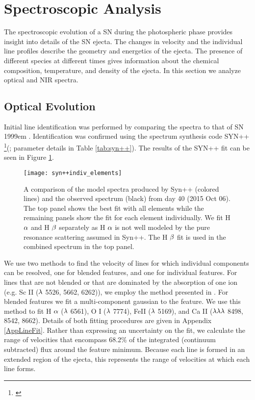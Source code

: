 \documentclass[a4paper,fleqn,usenatbib]{mnras}
\begin{document}
\section{Spectroscopic Analysis} \label{sec:SpecEvolve}
The spectroscopic evolution of a SN during the photospheric phase provides insight into details of the SN ejecta.
The changes in velocity and the individual line profiles describe the geometry and energetics of the ejecta. 
The presence of different species at different times gives information about the chemical composition, temperature, and density of the ejecta.
In this section we analyze optical and NIR spectra.
\subsection{Optical Evolution} \label{OpticalEvolve}
Initial line identification was performed by comparing the spectra to that of SN 1999em \citep{2001leonard}. 
Identification was confirmed using the spectrum synthesis code SYN++ \footnote{\citet{2013thomas}}(\citealt{2011thomas}; parameter details in Table \ref{tab:syn++}). 
The results of the SYN++ fit can be seen in Figure \ref{fig:syn++}.
\begin{figure*}
\begin{center}
\texttt{[image: syn++indiv\_elements]} %
\caption{A comparison of the model spectra produced by Syn++ (colored lines) and the observed spectrum (black) from day 40 (2015 Oct 06).
The top panel shows the best fit with all elements while the remaining panels show the fit for each element individually.
We fit H $\rm{\alpha}$ and H $\rm{\beta}$ separately as H $\rm{\alpha}$ is not well modeled by the pure resonance scattering assumed in Syn++.
The H $\rm{\beta}$ fit is used in the combined spectrum in the top panel.}
\label{fig:syn++}
\end{center}
\end{figure*}

We use two methods to find the velocity of lines for which individual components can be resolved, one for blended features, and one for individual features.
For lines that are not blended or that are dominated by the absorption of one ion (e.g. Sc II ($\rm{\lambda}$ 5526, 5662, 6262)), we employ the method presented in \citet{2012silverman}. 
For blended features we fit a multi-component gaussian to the feature.
We use this method to fit H $\rm{\alpha}$ ($\rm{\lambda}$ 6561), O I ($\rm{\lambda}$ 7774), FeII ($\rm{\lambda}$ 5169), and Ca II ($\rm{\lambda\lambda\lambda}$ 8498, 8542, 8662). 
Details of both fitting procedures are given in Appendix \ref{AppLineFit}.
Rather than expressing an uncertainty on the fit, we calculate the range of velocities that encompass 68.2\% of the integrated (continuum subtracted) flux around the feature minimum.
Because each line is formed in an extended region of the ejecta, this represents the range of velocities at which each line forms.
\end{document}
